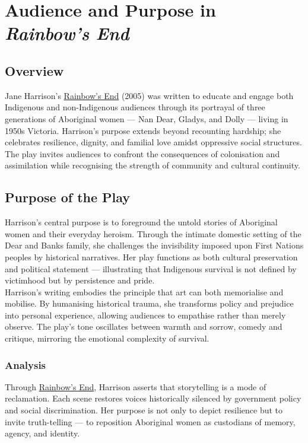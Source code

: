 \documentclass[a4paper]{article}
\begin{document}
\newpage
\section{Audience and Purpose in \textit{Rainbow's End}}

\subsection{Overview}
Jane Harrison’s \underline{Rainbow's End} (2005) was written to educate and engage both Indigenous and non-Indigenous audiences through its portrayal of three generations of Aboriginal women — Nan Dear, Gladys, and Dolly — living in 1950s Victoria. Harrison’s purpose extends beyond recounting hardship; she celebrates resilience, dignity, and familial love amidst oppressive social structures. The play invites audiences to confront the consequences of colonisation and assimilation while recognising the strength of community and cultural continuity.\\

\subsection{Purpose of the Play}
Harrison’s central purpose is to foreground the untold stories of Aboriginal women and their everyday heroism. Through the intimate domestic setting of the Dear and Banks family, she challenges the invisibility imposed upon First Nations peoples by historical narratives. Her play functions as both cultural preservation and political statement — illustrating that Indigenous survival is not defined by victimhood but by persistence and pride.\\

Harrison’s writing embodies the principle that art can both memorialise and mobilise. By humanising historical trauma, she transforms policy and prejudice into personal experience, allowing audiences to empathise rather than merely observe. The play’s tone oscillates between warmth and sorrow, comedy and critique, mirroring the emotional complexity of survival.\\

\subsubsection{Analysis}
Through \underline{Rainbow's End}, Harrison asserts that storytelling is a mode of reclamation. Each scene restores voices historically silenced by government policy and social discrimination. Her purpose is not only to depict resilience but to invite truth-telling — to reposition Aboriginal women as custodians of memory, agency, and identity.\\
\end{document}
